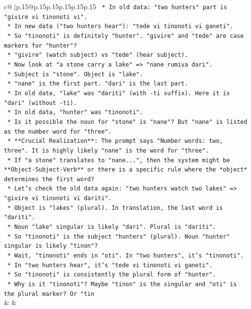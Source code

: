 \documentclass{article}
\begin{document}
{\begin{supertabular}{c@{$\;$}|p{.15\linewidth}@{}p{.15\linewidth}p{.15\linewidth}p{.15\linewidth}p{.15\linewidth}p{.15\linewidth}}
{{{\texttt{            *   In old data: "two hunters" part is "givire vi tinonoti vi".} \\
\texttt{            *   In new data ("two hunters hear"): "tede vi tinonoti vi ganeti".} \\
\texttt{            *   So "tinonoti" is definitely "hunter". "givire" and "tede" are case markers for "hunter"?} \\
\texttt{            *   "givire" (watch subject) vs "tede" (hear subject).} \\
\texttt{        *   Now look at "a stone carry a lake" => "nane rumiva dari".} \\
\texttt{            *   Subject is "stone". Object is "lake".} \\
\texttt{            *   "nane" is the first part. "dari" is the last part.} \\
\texttt{            *   In old data, "lake" was "dariti" (with {-}ti suffix). Here it is "dari" (without {-}ti).} \\
\texttt{            *   In old data, "hunter" was "tinonoti".} \\
\texttt{            *   Is it possible the noun for "stone" is "nane"? But "nane" is listed as the number word for "three".} \\
\texttt{            *   **Crucial Realization**: The prompt says "Number words: two, three". It is highly likely "nane" is the word for "three".} \\
\texttt{            *   If "a stone" translates to "nane...", then the system might be **Object{-}Subject{-}Verb** or there is a specific rule where the *object* determines the first word?} \\
\texttt{            *   Let's check the old data again: "two hunters watch two lakes" => "givire vi tinonoti vi dariti".} \\
\texttt{                *   Object is "lakes" (plural). In translation, the last word is "dariti".} \\
\texttt{                *   Noun "lake" singular is likely "dari". Plural is "dariti".} \\
\texttt{                *   So "tinonoti" is the subject "hunters" (plural). Noun "hunter" singular is likely "tinon"?} \\
\texttt{                *   Wait, "tinonoti" ends in "oti". In "two hunters", it's "tinonoti".} \\
\texttt{                *   In "two hunters hear", it's "tede vi tinonoti vi ganeti".} \\
\texttt{                *   So "tinonoti" is consistently the plural form of "hunter".} \\
\texttt{                *   Why is it "tinonoti"? Maybe "tinon" is the singular and "oti" is the plural marker? Or "tin} \\
            }
        }
    }
    & & \\ \\


\end{supertabular}}
\end{document}
